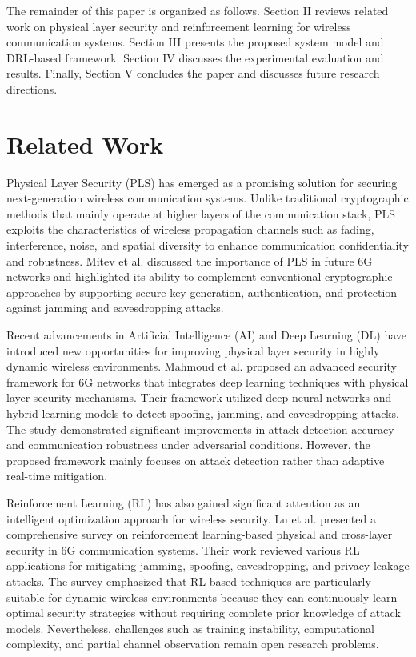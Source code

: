 \documentclass[conference]{IEEEtran}
\begin{document}
The remainder of this paper is organized as follows. Section II reviews related work on physical layer security and reinforcement learning for wireless communication systems. Section III presents the proposed system model and DRL-based framework. Section IV discusses the experimental evaluation and results. Finally, Section V concludes the paper and discusses future research directions.


\section{Related Work}

Physical Layer Security (PLS) has emerged as a promising solution for securing next-generation wireless communication systems. Unlike traditional cryptographic methods that mainly operate at higher layers of the communication stack, PLS exploits the characteristics of wireless propagation channels such as fading, interference, noise, and spatial diversity to enhance communication confidentiality and robustness. Mitev et al. \cite{b6} discussed the importance of PLS in future 6G networks and highlighted its ability to complement conventional cryptographic approaches by supporting secure key generation, authentication, and protection against jamming and eavesdropping attacks.

Recent advancements in Artificial Intelligence (AI) and Deep Learning (DL) have introduced new opportunities for improving physical layer security in highly dynamic wireless environments. Mahmoud et al. \cite{b1} proposed an advanced security framework for 6G networks that integrates deep learning techniques with physical layer security mechanisms. Their framework utilized deep neural networks and hybrid learning models to detect spoofing, jamming, and eavesdropping attacks. The study demonstrated significant improvements in attack detection accuracy and communication robustness under adversarial conditions. However, the proposed framework mainly focuses on attack detection rather than adaptive real-time mitigation.

Reinforcement Learning (RL) has also gained significant attention as an intelligent optimization approach for wireless security. Lu et al. \cite{b4} presented a comprehensive survey on reinforcement learning-based physical and cross-layer security in 6G communication systems. Their work reviewed various RL applications for mitigating jamming, spoofing, eavesdropping, and privacy leakage attacks. The survey emphasized that RL-based techniques are particularly suitable for dynamic wireless environments because they can continuously learn optimal security strategies without requiring complete prior knowledge of attack models. Nevertheless, challenges such as training instability, computational complexity, and partial channel observation remain open research problems.
\end{document}

